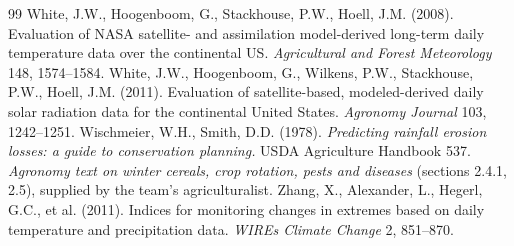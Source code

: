 \documentclass[11pt,a4paper]{article}
\begin{document}
\begin{thebibliography}{99}
 White, J.W., Hoogenboom, G., Stackhouse, P.W., Hoell, J.M. (2008). Evaluation of NASA satellite- and assimilation model-derived long-term daily temperature data over the continental US. \emph{Agricultural and Forest Meteorology} 148, 1574--1584.
 White, J.W., Hoogenboom, G., Wilkens, P.W., Stackhouse, P.W., Hoell, J.M. (2011). Evaluation of satellite-based, modeled-derived daily solar radiation data for the continental United States. \emph{Agronomy Journal} 103, 1242--1251.
 Wischmeier, W.H., Smith, D.D. (1978). \emph{Predicting rainfall erosion losses: a guide to conservation planning.} USDA Agriculture Handbook 537.
 \emph{Agronomy text on winter cereals, crop rotation, pests and diseases} (sections 2.4.1, 2.5), supplied by the team's agriculturalist.
 Zhang, X., Alexander, L., Hegerl, G.C., et al. (2011). Indices for monitoring changes in extremes based on daily temperature and precipitation data. \emph{WIREs Climate Change} 2, 851--870.
\end{thebibliography}
\end{document}
